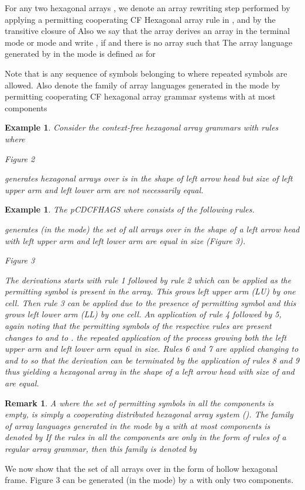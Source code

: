 \documentclass[11pt]{article}
\newtheorem{example}[theorem]{Example}
\newtheorem{remark}[theorem]{Remark}
\begin{document}
For any two hexagonal arrays , we denote 
an array rewriting step performed by applying a permitting cooperating CF Hexagonal array rule in ,
 and by   the transitive closure of 
 Also we say that the array  derives an array  in the terminal mode or  mode and write , if and there is no array  such that  The array language generated by  in the  mode is defined as
 for 

Note that  is any sequence of symbols belonging to  where repeated symbols are allowed.
 Also  denote the family of array languages generated in the  mode by permitting cooperating CF hexagonal array grammar systems with at most  components
\begin{example}Consider the context-free hexagonal array grammars with rules
 where


\centerline{Figure 2}
 \par  generates hexagonal arrays over 
is in the shape of left arrow head  but size of left upper arm and
left lower arm are not necessarily equal.





\end{example}
\begin{example}
The pCDCFHAGS
 where  consists  of the following rules.

generates (in the  mode) the set  of all arrays over
 in the shape of a left arrow head with left upper arm and
left lower arm are equal in size (Figure 3).

\centerline{Figure 3} The derivations starts with rule 1 followed
by rule 2 which can be applied as the permitting symbol  is
present in the array. This grows left upper arm (LU) by one cell.
Then rule 3 can be applied due to the presence of permitting
symbol  and this grows left lower arm (LL) by one cell. An
application of rule 4 followed by 5, again noting that the
permitting symbols of the respective rules are present changes
 to  and  to . the repeated application of the
process growing both the left upper arm and left lower arm equal
in size. Rules 6 and 7 are applied changing  to  and  to
 so that the derivation can be terminated by the application of
rules 8 and 9 thus yielding a hexagonal array in the shape of a
left arrow head with size of  and  are equal.
\end{example}



\begin{remark}A  where the set of permitting symbols in all the components is empty, is simply a cooperating distributed  hexagonal array system ()\cite{8}. The family of array languages generated in the  mode by a  with at most  components is denoted by  If the rules in all the components are only in the form of rules of a regular array grammar, then this family is denoted by 
\end{remark}
We now show that the set  of all  arrays over  in the form of hollow hexagonal frame.
Figure 3 can be generated (in the  mode) by a  with
only two components.
\end{document}
